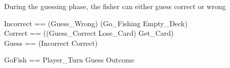 \documentclass{article}
\begin{document}
During the guessing phase, the fisher can either guess correct or wrong
\begin{zed}
    Incorrect == (Guess\_Wrong) \land (Go\_Fishing \lor Empty\_Deck)\\
    Correct == ((Guess\_Correct \pipe Lose\_Card) \pipe Get\_Card) \\
    Guess == (Incorrect \lor Correct)
\end{zed}

\begin{zed}
    GoFish == Player\_Turn \semi Guess \semi Outcome\\
\end{zed}
    
\end{document}
